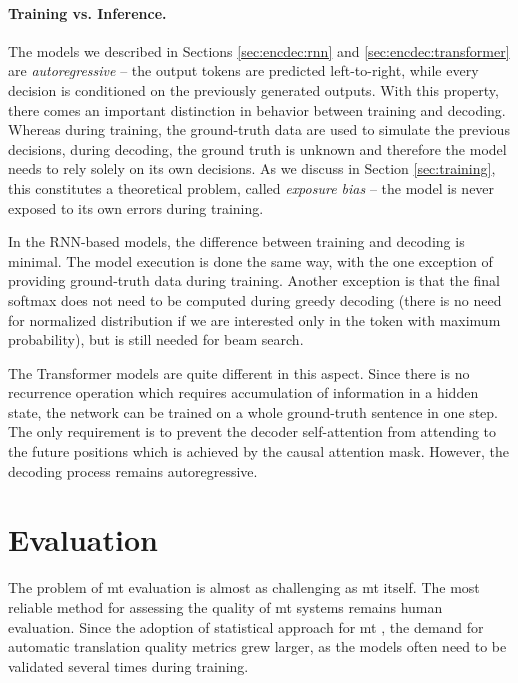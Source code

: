 \paragraph{Training vs. Inference.}
The models we described in Sections \ref{sec:encdec:rnn} and
\ref{sec:encdec:transformer} are \emph{autoregressive} -- the output tokens are
predicted left-to-right, while every decision is conditioned on the previously
generated outputs. With this property, there comes an important distinction in
behavior between training and decoding. Whereas during training, the
ground-truth data are used to simulate the previous decisions, during decoding,
the ground truth is unknown and therefore the model needs to rely solely on its
own decisions. As we discuss in Section \ref{sec:training}, this constitutes a
theoretical problem, called \emph{exposure bias} -- the model is never exposed
to its own errors during training.

In the RNN-based models, the difference between training and decoding is
minimal. The model execution is done the same way, with the one exception of
providing ground-truth data during training. Another exception is that the final
softmax does not need to be computed during greedy decoding (there is no need
for normalized distribution if we are interested only in the token with maximum
probability), but is still needed for beam search.

The Transformer models are quite different in this aspect. Since there is no
recurrence operation which requires accumulation of information in a hidden
state, the network can be trained on a whole ground-truth sentence in one step.
The only requirement is to prevent the decoder self-attention from attending to
the future positions which is achieved by the causal attention mask. However,
the decoding process remains autoregressive.

\section{Evaluation}
\label{sec:evaluation}

The problem of \ac{mt} evaluation is almost as challenging as \ac{mt} itself.
The most reliable method for assessing the quality of \ac{mt} systems remains
human evaluation.  Since the adoption of statistical approach for \ac{mt}
\citep{brown-etal-1993-mathematics,koehn-etal-2003-statistical}, the demand for
automatic translation quality metrics grew larger, as the models often need to
be validated several times during training.

